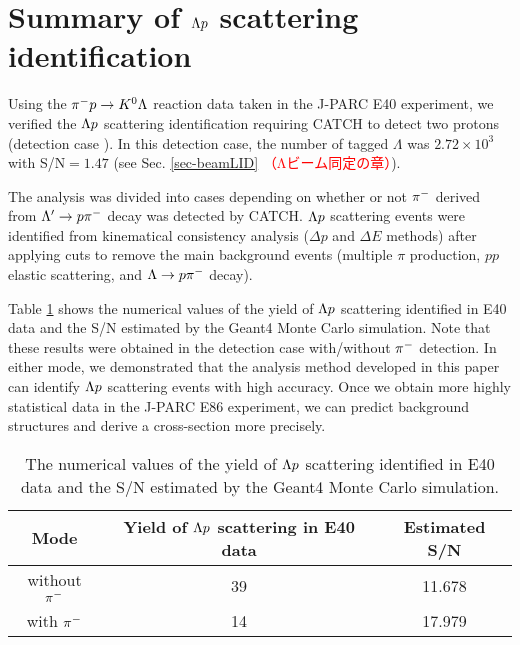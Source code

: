 \clearpage
\section{Summary of $\Lambda p$ scattering identification}
\label{sec-2p_summary}

Using the $\pi^- p \to K^0 \Lambda$ reaction data taken in the J-PARC E40 experiment, we verified the $\Lambda p$ scattering identification requiring CATCH to detect two protons (detection case ). In this detection case, the number of tagged $\Lambda$ was $2.72\times10^{3}$ with S/N$=1.47$ (see Sec. \ref{sec-beamLID} \textcolor{red}{（Λビーム同定の章）}). 

The analysis was divided into cases depending on whether or not $\pi^{-}$ derived from $\Lambda'\to p\pi^{-}$ decay was detected by CATCH. $\Lambda p$ scattering events were identified from kinematical consistency analysis ($\Delta p$ and $\Delta E$ methods) after applying cuts to remove the main background events (multiple $\pi$ production, $pp$ elastic scattering, and $\Lambda\to p\pi^{-}$ decay).

Table \ref{tab-2p_summary} shows the numerical values of the yield of $\Lambda p$ scattering identified in E40 data and the S/N estimated by the Geant4 Monte Carlo simulation. Note that these results were obtained in the detection case  with/without $\pi^{-}$ detection. In either mode, we demonstrated that the analysis method developed in this paper can identify $\Lambda p$ scattering events with high accuracy. Once we obtain more highly statistical data in the J-PARC E86 experiment, we can predict background structures and derive a cross-section more precisely.

\begin{table}[!tbph]
  \begin{center}
    \caption{The numerical values of the yield of $\Lambda p$ scattering identified in E40 data and the S/N estimated by the Geant4 Monte Carlo simulation. }
    \begin{tabular}{ccc}
      Mode & Yield of $\Lambda p$ scattering in E40 data& Estimated S/N \\ \hline \hline
      without $\pi^{-}$ & 39 & 11.678 \\ \hline
      with $\pi^{-}$ & 14 & 17.979 \\
    \end{tabular}
    \label{tab-2p_summary}
  \end{center}
\end{table}



%